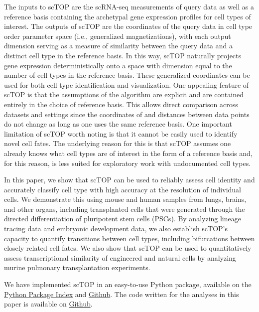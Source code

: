 \documentclass[aps,superscriptaddress, notitlepage,longbibliography]{revtex4-1}
\begin{document}
The inputs to scTOP are the scRNA-seq measurements of query data as well as a reference basis containing the archetypal gene expression profiles for cell types of interest. The outputs of scTOP are the coordinates of the query data in cell type order parameter space (i.e., generalized magnetizations), with each output dimension serving as a measure of similarity between the query data and a distinct cell type in the reference basis. In this way, scTOP naturally projects gene expression deterministically onto a space with dimension equal to the number of cell types in the reference basis. These generalized coordinates can be used for both cell type identification and visualization. One appealing feature of scTOP is that the assumptions of the algorithm are explicit and are contained entirely in the choice of reference basis. This allows direct comparison across datasets and settings since the coordinates of and distances between data points do not change as long as one uses the same reference basis. One important limitation of scTOP worth noting is that it cannot be easily used to identify novel cell fates. The underlying reason for this is that scTOP assumes one already knows what cell types are of interest in the form of a reference basis and, for this reason, is less suited for exploratory work with undocumented cell types. 

In this paper, we show that scTOP can be used to reliably assess cell identity and accurately classify cell type with high accuracy at the resolution of individual cells. We demonstrate this using mouse and human samples from lungs, brains, and other organs, including transplanted cells that were generated through the directed differentiation of pluripotent stem cells (PSCs). By analyzing lineage tracing data and embryonic development data, we also establish scTOP's capacity to quantify transitions between cell types, including bifurcations between closely related cell fates. We also show that scTOP can be used to quantitatively assess transcriptional similarity of engineered and natural cells by analyzing murine pulmonary transplantation experiments.

We have implemented scTOP in an easy-to-use Python package, available on the \href{https://pypi.org/project/scTOP/}{Python Package Index} and \href{https://github.com/Emergent-Behaviors-in-Biology/scTOP}{Github}. The code written for the analyses in this paper is available on \href{https://github.com/Emergent-Behaviors-in-Biology/scTOP-manuscript}{Github}.
\end{document}
